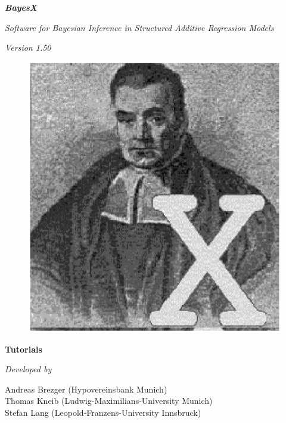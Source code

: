 \documentclass[11pt,a4paper,twoside]{bayesxreport}
\begin{document}
\MakeShortVerb{\#}

\thispagestyle{empty}

\begin{center}
{\bf \em \huge BayesX}

\vspace{0.5cm}

{\em \large Software for Bayesian Inference in Structured Additive
Regression Models}

\vspace{0.5cm}

{\em Version 1.50}

\vspace{0.5cm}

\begin{figure}[h]
\begin{center}
\includegraphics[scale=1.2]{grafiken/bayesicon.eps}
\end{center}
\end{figure}

\vfill

{\bf\sffamily \huge Tutorials}

\vfill

\end{center}

{\em Developed by}

Andreas Brezger (Hypovereinsbank Munich)\\
Thomas Kneib (Ludwig-Maximilians-University Munich)\\
Stefan Lang (Leopold-Franzens-University Innsbruck)\\
\end{document}
